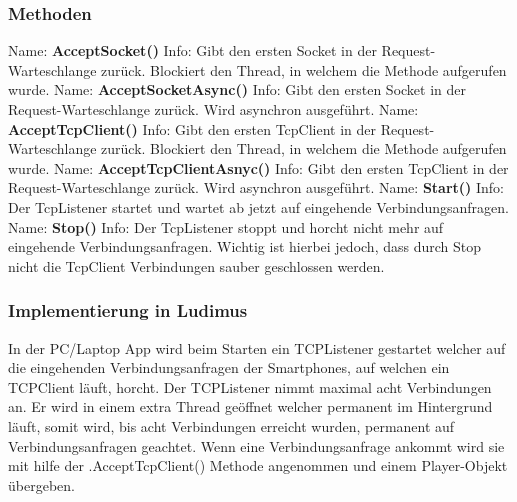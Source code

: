 \subsubsection{Methoden}
Name: \textbf{AcceptSocket()}
\newline
Info: Gibt den ersten Socket in der Request-Warteschlange zurück. Blockiert den Thread, in welchem die Methode aufgerufen wurde.
\newline \newline
Name: \textbf{AcceptSocketAsync()}
\newline
Info: Gibt den ersten Socket in der Request-Warteschlange zurück. Wird asynchron ausgeführt.
\newline \newline
Name: \textbf{AcceptTcpClient()}
\newline
Info: Gibt den ersten TcpClient in der Request-Warteschlange zurück. Blockiert den Thread, in welchem die Methode aufgerufen wurde.
\newline \newline
Name: \textbf{AcceptTcpClientAsnyc()}
\newline
Info: Gibt den ersten TcpClient in der Request-Warteschlange zurück. Wird asynchron ausgeführt.
\newline \newline
Name: \textbf{Start()}
\newline
Info: Der TcpListener startet und wartet ab jetzt auf eingehende Verbindungsanfragen.
\newline \newline
Name: \textbf{Stop()}
\newline
Info: Der TcpListener stoppt und horcht nicht mehr auf eingehende Verbindungsanfragen. Wichtig ist hierbei jedoch, dass durch Stop nicht die TcpClient Verbindungen sauber geschlossen werden.
\newline \newline
\subsubsection{Implementierung in Ludimus}
In der PC/Laptop App wird beim Starten ein TCPListener gestartet welcher auf die eingehenden Verbindungsanfragen der Smartphones, auf welchen ein TCPClient läuft, horcht. Der TCPListener nimmt maximal acht Verbindungen an. Er wird in einem extra Thread geöffnet welcher permanent im Hintergrund läuft, somit wird, bis acht Verbindungen erreicht wurden, permanent auf Verbindungsanfragen geachtet. Wenn eine Verbindungsanfrage ankommt wird sie mit hilfe der .AcceptTcpClient() Methode angenommen und einem Player-Objekt übergeben.
